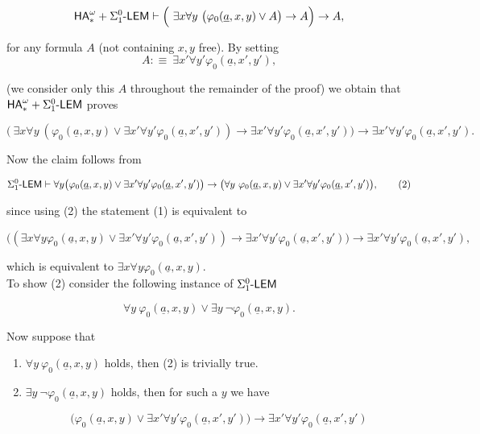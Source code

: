 \documentclass[1p]{elsarticle}
\newcommand{\usftext}[1]{\textsf{\upshape #1}}
\newcommand{\ha}{\ensuremath{{\usftext{HA}}^\omega}} %
\newcommand{\LEM}{\ensuremath{\Sigma^0_1\usftext{-LEM}}}
\newcommand{\tup}{\underline} %
\theoremstyle{plain}
\theoremstyle{definition}
\theoremstyle{remark}
\renewenvironment{proof}[1][]{\noindent{\bf Proof{#1}. }}{\nopagebreak[4]{\hspace*{\fill}


  $\Box$              %

 }{\vspace{2ex}}}
\renewcommand{\phi}{\varphi}
\theoremstyle{definition}
\begin{document}
{\begin{proof}
\[\ha_* + \LEM \vdash \Big(\ \exists x\forall y\ \big(\phi_0(\tup a,x,y) \vee A\big)\rightarrow A\Big)\rightarrow A,\]

for any formula $A$ (not containing $x,y$ free). By setting \[A:\equiv\ \exists x'\forall y' \phi_0(\tup a,x',y'),\]

(we consider only this $A$ throughout the remainder of the proof) we obtain that $\ha_* + \LEM$ proves

\[\big(\ \exists x\forall y\ (\phi_0(\tup a,x,y) \vee \exists x'\forall y' \phi_0(\tup a,x',y'))\rightarrow \exists x'\forall y' \phi_0(\tup a,x',y')\big)\rightarrow \exists x'\forall y' \phi_0(\tup a,x',y').\tag{1}\]

Now the claim follows from

\[

\LEM\vdash \forall y\big(\phi_0(\tup a,x,y) \vee \exists x'\forall y' \phi_0(\tup a,x',y') \big) \rightarrow \big(\forall y\ \phi_0(\tup a,x,y) \vee \exists x'\forall y' \phi_0(\tup a,x',y')\big),

\tag{2}

\]

since using (2) the statement (1) is equivalent to

\[  \big((\exists x \forall y \phi_0(\tup a,x,y) \vee \exists x'\forall y' \phi_0(\tup a,x',y'))\rightarrow \exists x'\forall y' \phi_0(\tup a,x',y')\big)\rightarrow \exists x'\forall y' \phi_0(\tup a,x',y'),\]

which is equivalent to $\exists x\forall y \phi_0(\tup a,x,y)$.\\

To show (2) consider the following instance of $\LEM$

\[

\forall y\ \phi_0(\tup a,x,y) \vee \exists y\ \neg\phi_0(\tup a,x,y).

\]

Now suppose that

\begin{enumerate}

\item $\forall y\ \phi_0(\tup a,x,y)$ holds, then (2) is trivially true.

\item $\exists y\ \neg \phi_0(\tup a,x,y)$ holds, then for such a $y$ we have

\[

\big(\phi_0(\tup a,x,y) \vee \exists x'\forall y' \phi_0(\tup a,x',y') \big) \rightarrow \exists x'\forall y' \phi_0(\tup a,x',y')

\]
\end{enumerate}
\end{proof}}
\end{document}
